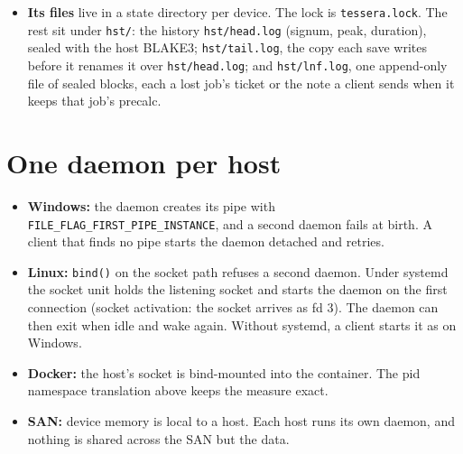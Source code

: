 \begin{itemize}
\begin{itemize}
\item On each sweep it reads the device's memory and the job's pid, and warns if the job grew.
\item After every change it runs admission and tells each admitted client.
\item It keeps each process's identity: a handle on Windows, a pidfd on Linux. A reused pid can never pass for the old process.
\end{itemize}
\item \textbf{Its files} live in a state directory per device. The lock is \texttt{tessera.\allowbreak{}lock}. The rest sit under \texttt{hst/\allowbreak{}}: the history \texttt{hst/\allowbreak{}head.\allowbreak{}log} (signum, peak, duration), sealed with the host BLAKE3; \texttt{hst/\allowbreak{}tail.\allowbreak{}log}, the copy each save writes before it renames it over \texttt{hst/\allowbreak{}head.\allowbreak{}log}; and \texttt{hst/\allowbreak{}lnf.\allowbreak{}log}, one append-only file of sealed blocks, each a lost job's ticket or the note a client sends when it keeps that job's precalc.
\end{itemize}

\section{\texorpdfstring{One daemon per host}{One daemon per host}}

\begin{itemize}
\item \textbf{Windows:} the daemon creates its pipe with \texttt{FILE\_\allowbreak{}FLAG\_\allowbreak{}FIRST\_\allowbreak{}PIPE\_\allowbreak{}INSTANCE}, and a second daemon fails at birth. A client that finds no pipe starts the daemon detached and retries.
\item \textbf{Linux:} \texttt{bind()} on the socket path refuses a second daemon. Under systemd the socket unit holds the listening socket and starts the daemon on the first connection (socket activation: the socket arrives as fd 3). The daemon can then exit when idle and wake again. Without systemd, a client starts it as on Windows.
\item \textbf{Docker:} the host's socket is bind-mounted into the container. The pid namespace translation above keeps the measure exact.
\item \textbf{SAN:} device memory is local to a host. Each host runs its own daemon, and nothing is shared across the SAN but the data.
\end{itemize}


